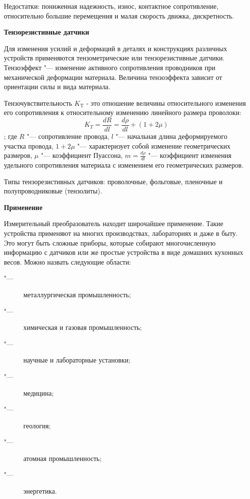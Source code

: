 \documentclass{article}
\begin{document}
Недостатки: пониженная надежность, износ, контактное сопротивление, относительно
большие перемещения и малая скорость движка, дискретность.

\vspace{1cm}
\begin{center}\textbf{\Large Тензорезистивные датчики}\end{center}
\vspace{0.5cm}
Для изменения усилий и деформаций в деталях и конструкциях различных устройств
применяются тензометрические или тензорезистивные датчики. Тензоэффект "---
изменение активного сопротивления проводников при механической деформации
материала. Величина тензоэффекта зависит от ориентации силы и вида материала.

Тензочувствительность $K_\text{T}$ - это отношение величины относительного
изменения его сопротивления к относительному изменению линейного размера
проволоки:
\[
  K_T = \frac{dR}{dl} = \frac{d\rho}{dl} + (1 + 2\mu)
\];
где $R$ "--- сопротивление провода, $l$ "--- начальная длина деформируемого
участка провода, $1 + 2\mu$ "--- характеризует собой изменение геометрических
размеров, $\mu$ "--- коэффициент Пуассона, $m = \frac{d\rho}{dl}$ "---
коэффициент изменения удельного сопротивления материала с изменением его
геометрических размеров.

Типы тензорезистивных датчиков: проволочные, фольговые, пленочные и
полупроводниковые (тензолиты).

\begin{center}\textbf{\Large Применение}\end{center}

Измерительный преобразователь находит широчайшее применение. Такие устройства
применяют на многих производствах, лабораториях и даже в быту. Это могут быть
сложные приборы, которые собирают многочисленную информацию с датчиков или же
простые устройства в виде домашних кухонных весов. Можно назвать следующие
области:
\begin{description}
  \item["---] металлургическая промышленность;
  \item["---] химическая и газовая промышленность;
  \item["---] научные и лабораторные установки;
  \item["---] медицина;
  \item["---] геология;
  \item["---] атомная промышленность;
  \item["---] энергетика.
\end{description}
\end{document}
